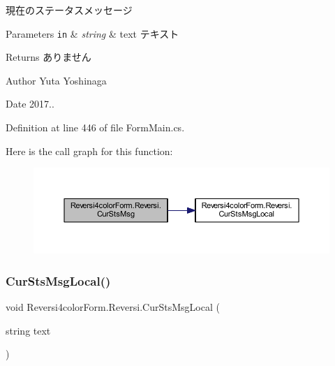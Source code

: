 現在のステータスメッセージ 


\begin{DoxyParams}[1]{Parameters}
\mbox{\tt in}  & {\em string} & text テキスト \\
\hline
\end{DoxyParams}
\begin{DoxyReturn}{Returns}
ありません 
\end{DoxyReturn}
\begin{DoxyAuthor}{Author}
Yuta Yoshinaga 
\end{DoxyAuthor}
\begin{DoxyDate}{Date}
2017.. 
\end{DoxyDate}


Definition at line 446 of file Form\+Main.\+cs.

Here is the call graph for this function\+:\nopagebreak
\begin{figure}[H]
\begin{center}
\leavevmode
\includegraphics[width=350pt]{class_reversi4color_form_1_1_reversi_af82882188f72f849b21890fe21199083_cgraph}
\end{center}
\end{figure}
\mbox{\label{class_reversi4color_form_1_1_reversi_a663e1d055e099d0855df8a34af31edf9}} 
\subsubsection{\texorpdfstring{Cur\+Sts\+Msg\+Local()}{CurStsMsgLocal()}}
{\footnotesize\ttfamily void Reversi4color\+Form.\+Reversi.\+Cur\+Sts\+Msg\+Local (\begin{DoxyParamCaption}\item[{string}]{text }\end{DoxyParamCaption})}



